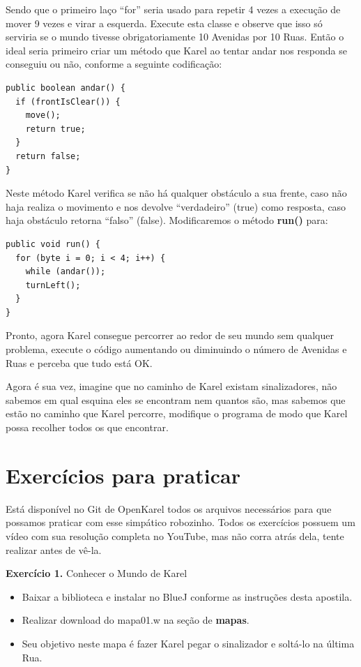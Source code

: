 \documentclass[a4paper,11pt]{article}
\begin{document}
Sendo que o primeiro laço ``for'' seria usado para repetir 4 vezes a execução de mover 9 vezes e virar a esquerda. Execute esta classe e observe que isso só serviria se o mundo tivesse obrigatoriamente 10 Avenidas por 10 Ruas. Então o ideal seria primeiro criar um método que Karel ao tentar andar nos responda se conseguiu ou não, conforme a seguinte codificação:
\begin{lstlisting}
public boolean andar() {
  if (frontIsClear()) {
    move();
    return true;
  }
  return false;
}
\end{lstlisting}

Neste método Karel verifica se não há qualquer obstáculo a sua frente, caso não haja realiza o movimento e nos devolve ``verdadeiro'' (true) como resposta, caso haja obstáculo retorna ``falso'' (false). Modificaremos o método \textbf{run()} para:
\begin{lstlisting}
public void run() {
  for (byte i = 0; i < 4; i++) {
    while (andar());
    turnLeft();
  }
}
\end{lstlisting}

Pronto, agora Karel consegue percorrer ao redor de seu mundo sem qualquer problema, execute o código aumentando ou diminuindo o número de Avenidas e Ruas e perceba que tudo está OK.

Agora é sua vez, imagine que no caminho de Karel existam sinalizadores, não sabemos em qual esquina eles se encontram nem quantos são, mas sabemos que estão no caminho que Karel percorre, modifique o programa de modo que Karel possa recolher todos os que encontrar.

\section{Exercícios para praticar}

Está disponível no Git de OpenKarel \cite{github} todos os arquivos necessários para que possamos praticar com esse simpático robozinho. Todos os exercícios possuem um vídeo com sua resolução completa no YouTube, mas não corra atrás dela, tente realizar antes de vê-la.

\textbf{Exercício 1.} Conhecer o Mundo de Karel \vspace{-1em}
\begin{itemize}[nolistsep]
	\item Baixar a biblioteca e instalar no BlueJ conforme as instruções desta apostila.
	\item Realizar download do mapa01.w na seção de \textbf{mapas}.
	\item Seu objetivo neste mapa é fazer Karel pegar o sinalizador e soltá-lo na última Rua.
\end{itemize}
\end{document}
